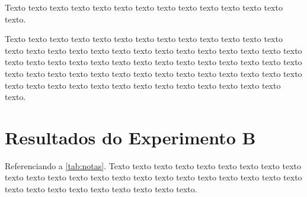 \begin{figure}[h!]
	\captionsetup{width=16cm}
\end{figure}

Texto texto texto texto texto texto texto texto texto texto texto texto texto texto.

Texto texto texto texto texto texto texto texto texto texto texto texto texto texto texto texto texto texto texto texto texto texto texto texto texto texto texto texto texto texto texto texto texto texto texto texto texto texto texto texto texto texto texto texto texto texto texto texto texto texto texto texto texto texto texto texto texto texto texto texto texto texto texto texto texto texto texto texto texto.

\section{Resultados do Experimento B}
\label{sec:resultados-do-experimento-b}

Referenciando a \autoref{tab:notas}. Texto texto texto texto texto texto texto texto texto texto texto texto texto texto texto texto texto texto texto texto texto texto texto texto texto texto texto texto texto texto texto texto.

\begin{table}[!ht]	
	\captionsetup{width=11.3cm}%
\end{table}

